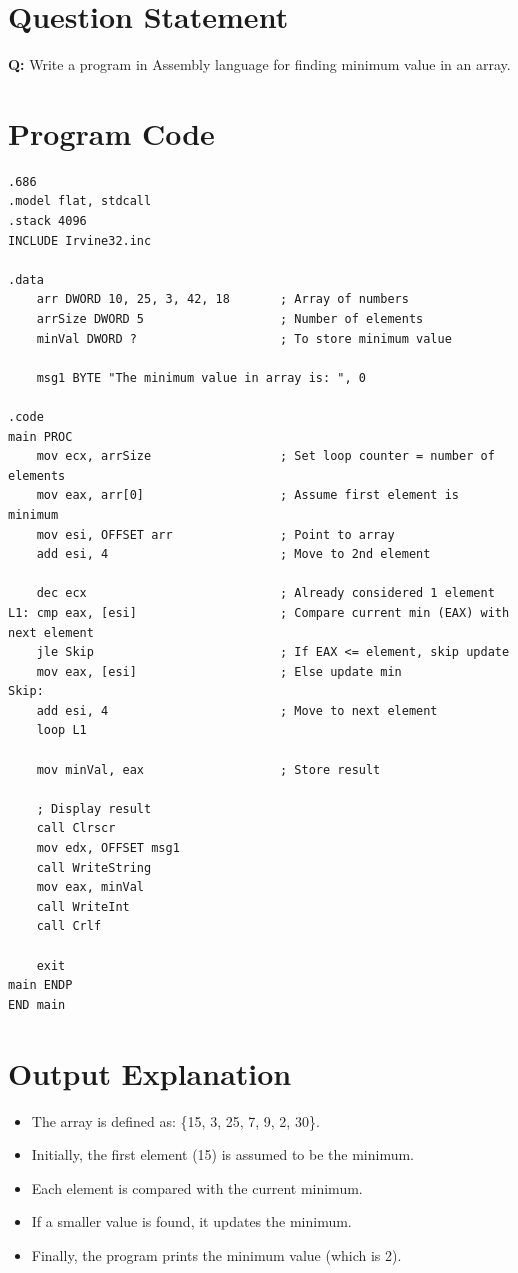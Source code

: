 \documentclass[a4paper,12pt]{report}
\begin{document}
\thispagestyle{empty}
\newpage

\section{Question Statement}
\noindent
\textbf{Q:} Write a program in Assembly language for finding minimum value in an array.

\section{Program Code}

\begin{lstlisting}[language={[x86masm]Assembler}]
.686
.model flat, stdcall
.stack 4096
INCLUDE Irvine32.inc

.data
    arr DWORD 10, 25, 3, 42, 18       ; Array of numbers
    arrSize DWORD 5                   ; Number of elements
    minVal DWORD ?                    ; To store minimum value

    msg1 BYTE "The minimum value in array is: ", 0

.code
main PROC
    mov ecx, arrSize                  ; Set loop counter = number of elements
    mov eax, arr[0]                   ; Assume first element is minimum
    mov esi, OFFSET arr               ; Point to array
    add esi, 4                        ; Move to 2nd element

    dec ecx                           ; Already considered 1 element
L1: cmp eax, [esi]                    ; Compare current min (EAX) with next element
    jle Skip                          ; If EAX <= element, skip update
    mov eax, [esi]                    ; Else update min
Skip:
    add esi, 4                        ; Move to next element
    loop L1

    mov minVal, eax                   ; Store result

    ; Display result
    call Clrscr
    mov edx, OFFSET msg1
    call WriteString
    mov eax, minVal
    call WriteInt
    call Crlf

    exit
main ENDP
END main
\end{lstlisting}

\section{Output Explanation}
\begin{itemize}
    \item The array is defined as: \{15, 3, 25, 7, 9, 2, 30\}.
    \item Initially, the first element (15) is assumed to be the minimum.
    \item Each element is compared with the current minimum.
    \item If a smaller value is found, it updates the minimum.
    \item Finally, the program prints the minimum value (which is 2).
\end{itemize}
\end{document}
